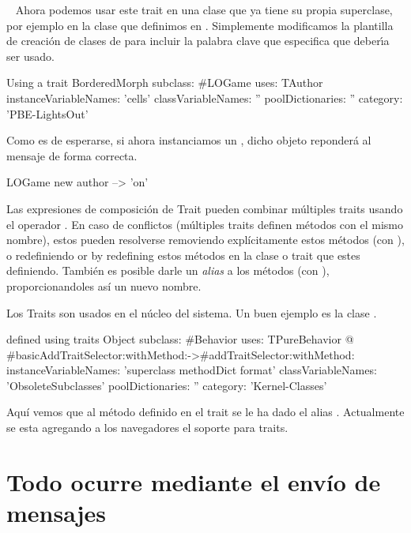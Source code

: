 \documentclass[a4paper,10pt,twoside]{book}
\begin{document}
\
\noindent
Ahora podemos usar este trait en una clase que ya tiene su propia superclase, por ejemplo en la clase  que definimos en .
Simplemente modificamos la plantilla de creaci\'on de clases de  \ct{LOGame} para incluir la palabra clave  \ct{uses:}  que especifica que  deber\'\i{}a ser usado.



\begin{classdef}[sbegamewithtrait]{Using a trait}
BorderedMorph subclass: #LOGame
	uses: TAuthor
	instanceVariableNames: 'cells'
	classVariableNames: ''
	poolDictionaries: ''
	category: 'PBE-LightsOut'
\end{classdef}

Como es de esperarse, si ahora instanciamos un , dicho objeto reponder\'a al mensaje    de forma correcta.

\begin{code}{}
LOGame new author --> 'on'
\end{code}

Las expresiones de composici\'on de Trait pueden combinar m\'ultiples traits usando el operador \ct{+}.
En caso de conflictos (\ie m\'ultiples traits definen m\'etodos con el mismo nombre), estos pueden resolverse removiendo expl\'icitamente estos m\'etodos (con \ct{-}), o redefiniendo or by redefining estos m\'etodos en la clase o trait que estes definiendo.
Tambi\'en es posible darle un \emph{alias} a los m\'etodos (con \ct{@}), proporcionandoles as\'i un nuevo nombre.

Los Traits son usados en el n\'ucleo del sistema.
Un buen ejemplo es la clase \mbox{.}

\begin{classdef}[behaviorwithtraits]{ defined using traits}
Object subclass: #Behavior
	uses: TPureBehavior @ {#basicAddTraitSelector:withMethod:->#addTraitSelector:withMethod:}
	instanceVariableNames: 'superclass methodDict format'
	classVariableNames: 'ObsoleteSubclasses'
	poolDictionaries: ''
	category: 'Kernel-Classes'
\end{classdef}
\noindent
Aqu\'i vemos que al m\'etodo  definido en el trait  se le ha dado el alias .
Actualmente se esta agregando a los navegadores el soporte para traits.

\section{Todo ocurre mediante el env\'io de mensajes}
\end{document}
